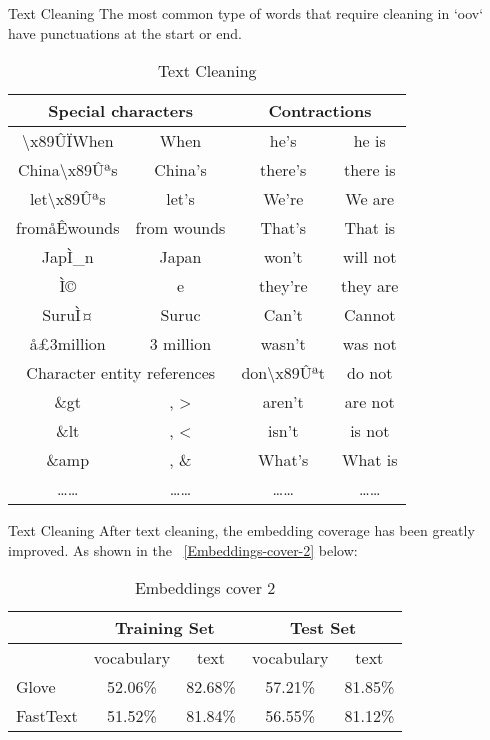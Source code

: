 \documentclass[
 size=12pt,
 paper=smartboard, %
 mode=present, %
 display=slides, %
 style=tuliplab,  %
 pauseslide,
 fleqn,leqno,clock]{powerdot}
\begin{document}
\begin{slide}{Text Cleaning}
The most common type of words that require cleaning in `oov` 
have punctuations at the start or end.
	
\begin{table}[htbp]
	\centering
	\caption{Text Cleaning}
	\begin{tabular}{cccc}
		\toprule
		\multicolumn{2}{c}{Special characters} & \multicolumn{2}{c}{Contractions} \\
		\midrule
		\textbackslash{}x89ÛÏWhen &  When & he's  &  he is \\
		China\textbackslash{}x89Ûªs &  China's & there's &  there is \\
		let\textbackslash{}x89Ûªs &  let's & We're &  We are \\
		fromåÊwounds &  from wounds & That's &  That is \\
		JapÌ\_n &  Japan & won't &  will not \\
		Ì©    &  e    & they're &  they are \\
		SuruÌ¤ &  Suruc & Can't &  Cannot \\
		å£3million &  3 million & wasn't &  was not \\
		\cmidrule{1-2}    \multicolumn{2}{c}{Character entity references} & don\textbackslash{}x89Ûªt &  do not \\
		\cmidrule{1-2}    \&gt  & , >   & aren't &  are not \\
		\&lt  & , <   & isn't &  is not \\
		\&amp & , \&  & What's &  What is \\
		……    & ……    & ……    & …… \\
		\bottomrule
	\end{tabular}%
\end{table}%
\end{slide}

\begin{slide}{Text Cleaning}
After text cleaning, the embedding coverage has been greatly improved.
As shown in the ~\cref{Embeddings-cover-2} below:
\begin{table}[htbp]
	\centering
	\caption{Embeddings cover 2}
	\begin{tabular}{lcccc}
		\toprule
		& \multicolumn{2}{c}{Training Set} & \multicolumn{2}{c}{Test Set} \\
		\midrule
		& vocabulary & text  & vocabulary & text \\
		\midrule
		Glove & 52.06\% & 82.68\% & 57.21\% & 81.85\% \\
		FastText & 51.52\% & 81.84\% & 56.55\% & 81.12\% \\
		\bottomrule
	\end{tabular}%
	\label{tab:Embeddings-cover-2}%
\end{table}%
\end{slide}
\end{document}
